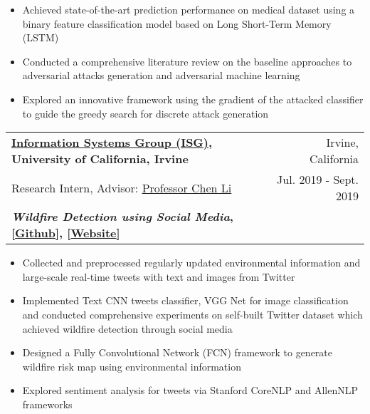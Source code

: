 \documentclass[letterpaper,11pt]{article}
\makeatletter
\newcommand{\resumeSubheading}[6]{
  \vspace{-1pt}\item
    \begin{tabular*}{0.97\textwidth}[t]{l@{\extracolsep{\fill}}r}
      \textbf{#1} & #2 \\
      #3 & #4 \\
      \textbf{#5} & \textbf{#6} \\
    \end{tabular*}\vspace{-5pt}
}
\makeatother
\begin{document}
        \begin{itemize}
            \item Achieved state-of-the-art prediction performance on medical dataset using a binary feature classification model based on Long Short-Term Memory (LSTM)
          

          \item Conducted a comprehensive literature review on the baseline approaches to adversarial attacks generation and adversarial machine learning
          
          \item Explored an innovative framework using the gradient of the attacked classifier to guide the greedy search for discrete attack generation
          
        \end{itemize}
        
    \resumeSubheading
      {\href{https://isg.ics.uci.edu/}{Information Systems Group (ISG)}, University of California, Irvine}{Irvine, California}
      {Research Intern, Advisor: \href{https://chenli.ics.uci.edu/}{Professor Chen Li}}{Jul. 2019 - Sept. 2019}
      {\textit{Wildfire Detection using Social Media}, [\href{https://github.com/ISG-ICS/Wildfires}{Github}], [\href{http://wildfires.ics.uci.edu:2333/}{Website}]}{}
      
        \begin{itemize}
          \item Collected and preprocessed regularly updated environmental information and large-scale real-time tweets with text and images from Twitter
          
          \item Implemented Text CNN tweets classifier, VGG Net for image classification and conducted comprehensive experiments on self-built Twitter dataset which achieved wildfire detection through social media
          
          \item Designed a Fully Convolutional Network (FCN) framework to generate wildfire risk map using environmental information
          
          \item Explored sentiment analysis for tweets via Stanford CoreNLP and AllenNLP frameworks
        \end{itemize}
        
\end{document}
